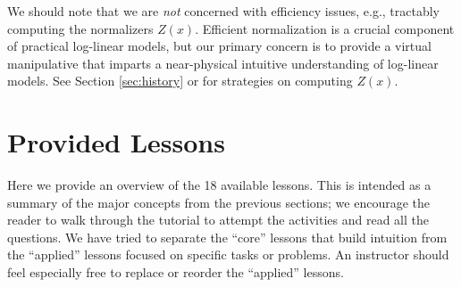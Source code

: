 \documentclass[11pt,letterpaper]{article}
\newcommand{\Note}[1]{}
\renewcommand{\Note}[1]{\hl{[#1]}}  %
\newcommand{\NoteSigned}[3]{{\sethlcolor{#2}\Note{#1: #3}}}
\newcommand{\NoteFF}[1]{\NoteSigned{FF}{LightBlue}{#1}}
\newcommand{\NumLessons}[0]{18}%
\begin{document}


We should note that we are \textit{not} concerned with efficiency issues, e.g.,  
tractably computing the normalizers $Z(x)$. Efficient normalization
is a crucial component of practical log-linear models, but our primary concern is to provide a virtual 
manipulative that imparts a near-physical intuitive understanding of log-linear models. See Section 
\ref{sec:history} or  for strategies on computing
$Z(x)$.



\section{Provided Lessons}\label{sec:lessons}
Here we provide an overview of the \NumLessons{} available
lessons. This is intended as a summary of the major concepts from the
previous sections; we encourage the reader to walk through the
tutorial to attempt the activities and read all the questions. We have
tried to separate the ``core'' lessons that build intuition from the
``applied'' lessons focused on specific tasks or problems.  An
instructor should feel especially free to replace or reorder the
``applied'' lessons.
\end{document}
